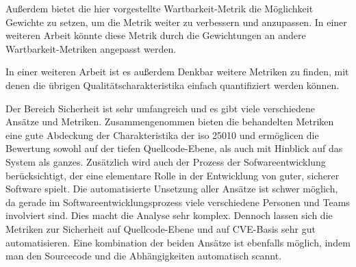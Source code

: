 \documentclass[12pt, a4paper, ngerman]{article}
\begin{document}
Außerdem bietet die hier vorgestellte Wartbarkeit-Metrik 
die Möglichkeit Gewichte zu setzen, 
um die Metrik weiter zu verbessern und anzupassen.
In einer weiteren Arbeit könnte diese Metrik durch
die Gewichtungen an andere Wartbarkeit-Metriken angepasst werden.

In einer weiteren Arbeit ist es außerdem Denkbar weitere Metriken zu finden,
mit denen die übrigen Qualitätscharakteristika 
einfach quantifiziert werden können.

Der Bereich Sicherheit ist sehr umfangreich und es gibt viele verschiedene Ansätze und Metriken.
Zusammengenommen bieten die behandelten Metriken eine gute Abdeckung der Charakteristika der \ac{iso} 25010 und 
ermöglicen die Bewertung sowohl auf der tiefen Quellcode-Ebene, als auch mit Hinblick auf das System als ganzes.
Zusätzlich wird auch der Prozess der Sofwareentwicklung berücksichtigt, 
der eine elementare Rolle in der Entwicklung von guter, sicherer Software spielt. 
Die automatisierte Unsetzung aller Ansätze ist schwer möglich, 
da gerade im Softwareentwicklungsprozess viele verschiedene Personen und Teams involviert sind.
Dies macht die Analyse sehr komplex.
Dennoch lassen sich die Metriken zur Sicherheit auf Quellcode-Ebene und auf CVE-Basis sehr gut automatisieren.
Eine kombination der beiden Ansätze ist ebenfalls möglich, indem man den Sourcecode und die Abhängigkeiten automatisch scannt. 

\newpage
\printbibliography
\end{document}
